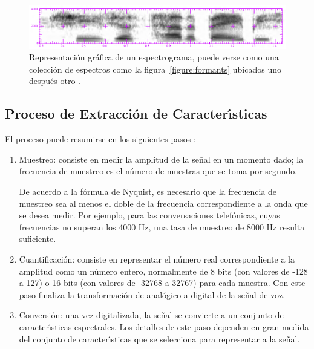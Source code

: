 \begin{figure}[H]
\centering
\includegraphics[width=0.9\linewidth]{./graphics/spectrogram.png}
\caption{Representaci\'on gr\'afica de un espectrograma, puede verse como una colecci\'on de espectros como la 
    figura~\ref{figure:formants} ubicados uno despu\'es otro \cite{Jurafsky}.}
\label{figure:spectrogram}
\end{figure}

\subsection{Proceso de Extracci\'on de Caracter{\'\i}sticas}
El proceso puede resumirse en los siguientes pasos \cite{Jurafsky}:

\begin{enumerate}
\item Muestreo: consiste en medir la amplitud de la se\~nal en un momento dado; la frecuencia de muestreo es el 
n\'umero de muestras que se toma por segundo. 

De acuerdo a la f\'ormula de Nyquist, es necesario que la frecuencia de muestreo sea al menos el doble de la frecuencia 
correspondiente a la onda que se desea medir. Por ejemplo, para las conversaciones telef\'onicas, cuyas frecuencias no 
superan los 4000 Hz, una tasa de muestreo de 8000 Hz resulta suficiente.

\item Cuantificaci\'on: consiste en representar el n\'umero real correspondiente a la amplitud 
como un n\'umero entero, normalmente de 8 bits (con valores de -128 a 127) o 16 bits (con valores de -32768 a 32767) para cada muestra. 
Con este paso finaliza la transformaci\'on de anal\'ogico a digital de la se\~nal de voz.

\item Conversi\'on: una vez digitalizada, la se\~nal se convierte a un conjunto de caracter{\'\i}sticas espectrales. Los detalles de este 
paso dependen en gran medida del conjunto de caracter{\'\i}sticas que se selecciona para representar a la se\~nal.

\end{enumerate}

